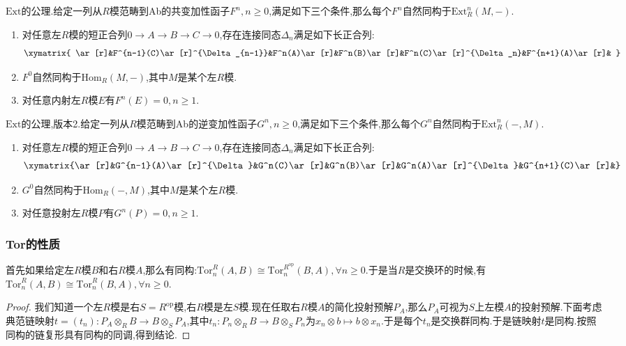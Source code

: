 $\mathrm{Ext}$的公理.给定一列从$R$模范畴到Ab的共变加性函子$F^n,n\ge0$,满足如下三个条件,那么每个$F^n$自然同构于$\mathrm{Ext}_R^n(M,-)$.
\begin{enumerate}
	\item 对任意左$R$模的短正合列$0\to A\to B\to C\to0$,存在连接同态$\Delta_n$满足如下长正合列:
	$$\xymatrix{
		\ar[r]&F^{n-1}(C)\ar[r]^{\Delta_{n-1}}&F^n(A)\ar[r]&F^n(B)\ar[r]&F^n(C)\ar[r]^{\Delta_n}&F^{n+1}(A)\ar[r]&
	}$$
	\item $F^0$自然同构于$\mathrm{Hom}_R(M,-)$,其中$M$是某个左$R$模.
	\item 对任意内射左$R$模$E$有$F^n(E)=0,n\ge1$.
\end{enumerate}

$\mathrm{Ext}$的公理,版本2.给定一列从$R$模范畴到Ab的逆变加性函子$G^n,n\ge0$,满足如下三个条件,那么每个$G^n$自然同构于$\mathrm{Ext}_R^n(-,M)$.
\begin{enumerate}
	\item 对任意左$R$模的短正合列$0\to A\to B\to C\to0$,存在连接同态$\Delta_n$满足如下长正合列:
	$$\xymatrix{\ar[r]&G^{n-1}(A)\ar[r]^{\Delta}&G^n(C)\ar[r]&G^n(B)\ar[r]&G^n(A)\ar[r]^{\Delta}&G^{n+1}(C)\ar[r]&}$$
	\item $G^0$自然同构于$\mathrm{Hom}_R(-,M)$,其中$M$是某个左$R$模.
	\item 对任意投射左$R$模$P$有$G^n(P)=0,n\ge1$.
\end{enumerate}
\subsubsection{Tor的性质}

首先如果给定左$R$模$B$和右$R$模$A$,那么有同构:$\mathrm{Tor}_n^R(A,B)\cong\mathrm{Tor}_n^{R^{\mathrm{op}}}(B,A),\forall n\ge0$.于是当$R$是交换环的时候,有$\mathrm{Tor}_n^R(A,B)\cong\mathrm{Tor}_n^R(B,A),\forall n\ge0$.
\begin{proof}
	
	我们知道一个左$R$模是右$S=R^{\mathrm{op}}$模,右$R$模是左$S$模.现在任取右$R$模$A$的简化投射预解$P_A$,那么$P_A$可视为$S$上左模$A$的投射预解.下面考虑典范链映射$t=(t_n):P_A\otimes_RB\to B\otimes_SP_A$,其中$t_n:P_n\otimes_RB\to B\otimes_SP_n$为$x_n\otimes b\mapsto b\otimes x_n$.于是每个$t_n$是交换群同构.于是链映射$t$是同构.按照同构的链复形具有同构的同调,得到结论.
\end{proof}

